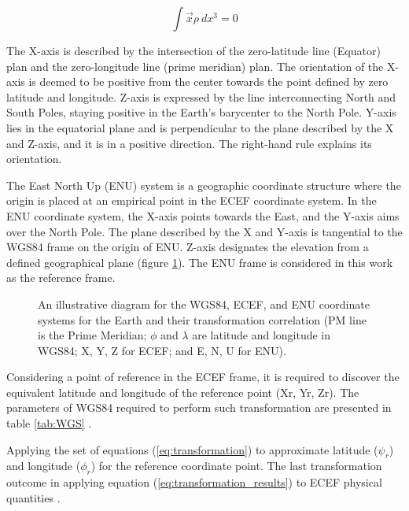 \begin{equation}
  \int \overrightarrow{x}\rho~dx^3 = 0
  \label{eq:ecef}
\end{equation}

The X-axis is described by the intersection of the zero-latitude line (Equator) plan and the zero-longitude line (prime meridian) plan. The orientation of the X-axis is deemed to be positive from the center towards the point defined by zero latitude and longitude. Z-axis is expressed by the line interconnecting North and South Poles, staying positive in the Earth's barycenter to the North Pole. Y-axis lies in the equatorial plane and is perpendicular to the plane described by the X and Z-axis, and it is in a positive direction. The right-hand rule explains its orientation.

The East North Up (ENU) system is a geographic coordinate structure where the origin is placed at an empirical point in the ECEF coordinate system. In the ENU coordinate system, the X-axis points towards the East, and the Y-axis aims over the North Pole. The plane described by the X and Y-axis is tangential to the WGS84 frame on the origin of ENU. Z-axis designates the elevation from a defined geographical plane (figure \ref{fig:ECEF}). The ENU frame is considered in this work as the reference frame.

\begin{figure}[H]
  \centering
  \resizebox{0.70\linewidth}{!}{}
  \caption{An illustrative diagram for the WGS84, ECEF, and ENU coordinate systems for the Earth and their transformation correlation (PM line is the Prime Meridian; $\phi$ and $\lambda$ are latitude and longitude in WGS84; X, Y, Z for ECEF; and E, N, U for ENU).  }
  \label{fig:ECEF}
\end{figure}

Considering a point of reference in the ECEF frame, it is required to discover the equivalent latitude and longitude of the reference point (Xr, Yr, Zr). The parameters of WGS84 required to perform such transformation are presented in table \ref{tab:WGS} \cite{soler1988coordinate}.

\begin{figure}[H]
  \centering
  
\end{figure}


Applying the set of equations (\ref{eq:transformation}) to approximate latitude ($\psi_r$) and longitude ($\phi_r$) for the reference coordinate point. The last transformation outcome in applying equation (\ref{eq:transformation_results}) to ECEF physical quantities \cite{boucher2001itrs}.

